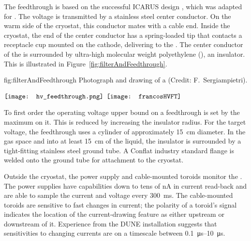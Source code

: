 The  feedthrough %
is based on the successful ICARUS design \cite{Icarus-T600}, %
which was adapted for .  The voltage is transmitted by a stainless steel center conductor.  On the warm side of the cryostat, this conductor mates with a cable end.  Inside the cryostat, the end of the center conductor has a spring-loaded tip that %
contacts a receptacle cup mounted on the cathode, delivering  to the .  The center conductor of the \fdth is surrounded by ultra-high molecular weight polyethylene (), an insulator. This is illustrated in Figure~\ref{fig:filterAndFeedthrough}.

\begin{dunefigure}{fig:filterAndFeedthrough}
{  Photograph and drawing of a  \fdth (Credit:  F.~Sergiampietri).}
\begin{minipage}{\textwidth}%
  \centering
 $\vcenter{\hbox{\texttt{[image: hv\_feedthrough.png]}}}$
 \hspace*{0.001\textwidth}  $\vcenter{\hbox{\texttt{[image: francosHVFT]}}}$
\end{minipage}
\end{dunefigure}

To first order the operating voltage upper bound on a feedthrough is set by the maximum \efield{} on it. %
This \efield{} is reduced by increasing the insulator radius.  For the target voltage, the feedthrough uses a  cylinder of approximately \SI{15}{cm} diameter.  In the gas space and into at least \SI{15}{\centi\meter} of the liquid, the insulator is surrounded by a tight-fitting stainless steel ground tube.  A %
Conflat industry standard flange is welded onto the ground tube for attachment to the cryostat.

Outside the cryostat, the  power supply and cable-mounted toroids monitor the .    The power supplies 
have capabilities down to tens of \si{\nano\ampere} in current read-back 
and are able to sample the current and voltage every \SI{300}{\ms}.  The cable-mounted toroids are sensitive to fast changes in current;  
the polarity of a toroid's signal  
indicates the location of the current-drawing feature as either upstream or downstream of it.  Experience from the DUNE  installation suggests that sensitivities to changing currents %
are on a timescale between \SIrange{0.1}{10}{\micro\s}.

